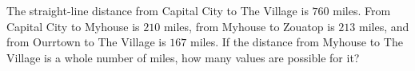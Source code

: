 The straight-line distance from Capital City to The Village is $760$ miles. From Capital City to Myhouse is $210$ miles, from Myhouse to Zouatop is $213$ miles, and from Ourrtown to The Village is $167$ miles. If the distance from Myhouse to The Village is a whole number of miles, how many values are possible for it?
